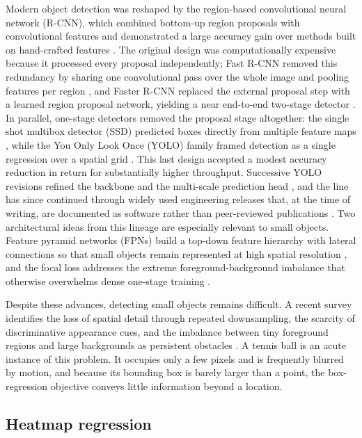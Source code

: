 Modern object detection was reshaped by the region-based convolutional
neural network (R-CNN), which combined bottom-up region proposals with
convolutional features and demonstrated a large accuracy gain over methods
built on hand-crafted features \cite{girshick2014rcnn}. The original design
was computationally expensive because it processed every proposal
independently; Fast R-CNN removed this redundancy by sharing one
convolutional pass over the whole image and pooling features per region
\cite{girshick2015fastrcnn}, and Faster R-CNN replaced the external
proposal step with a learned region proposal network, yielding a near
end-to-end two-stage detector \cite{ren2017fasterrcnn}. In parallel,
one-stage detectors removed the proposal stage altogether: the single shot
multibox detector (SSD) predicted boxes directly from multiple feature maps
\cite{liu2016ssd}, while the You Only Look Once (YOLO) family framed
detection as a single regression over a spatial grid
\cite{redmon2016yolo}. This last design accepted a modest accuracy
reduction in return for substantially higher throughput. Successive YOLO revisions refined the backbone and the
multi-scale prediction head \cite{redmon2018yolov3}, and the line has since
continued through widely used engineering releases that, at the time of
writing, are documented as software rather than peer-reviewed publications
\cite{jocher2024yolo11}. Two architectural ideas from this lineage are
especially relevant to small objects. Feature pyramid networks (FPNs) build a
top-down feature hierarchy with lateral connections so that small objects
remain represented at high spatial resolution \cite{lin2017fpn}, and the
focal loss addresses the extreme foreground-background imbalance that
otherwise overwhelms dense one-stage training \cite{lin2017focalloss}.

Despite these advances, detecting small objects remains difficult. A recent
survey identifies the loss of spatial detail through repeated downsampling,
the scarcity of discriminative appearance cues, and the imbalance between
tiny foreground regions and large backgrounds as persistent obstacles
\cite{cheng2023smallobjectsurvey}. A tennis ball is an acute instance of this
problem. It occupies only a few pixels and is frequently blurred by motion,
and because its bounding box is barely larger than a point, the
box-regression objective conveys little information beyond a location.

\subsection{Heatmap regression}
\label{sec:rw-heatmap}

